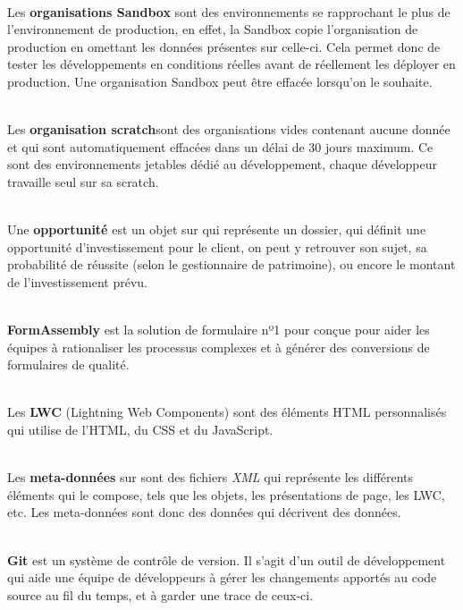 \documentclass[12pt,oneside,noprintercorrection]{iut}
\begin{document}
    ~\\\indent Les \textbf{organisations Sandbox} sont des environnements \slf{} se rapprochant le plus de l'environnement de production, en effet, la Sandbox copie l'organisation de production en omettant les données présentes sur celle-ci. Cela permet donc de tester les développements en conditions réelles avant de réellement les déployer en production. Une organisation Sandbox peut être effacée lorsqu'on le souhaite.\newline
    
    ~\\\indent Les \textbf{organisation scratch}sont des organisations vides contenant aucune donnée et qui sont automatiquement effacées dans un délai de 30 jours maximum. Ce sont des environnements jetables dédié au développement, chaque développeur travaille seul sur sa scratch.\newline


    ~\\\indent Une \textbf{opportunité} est un objet sur \slf{} qui représente un dossier, qui définit une opportunité d'investissement pour le client, on peut y retrouver son sujet, sa probabilité de réussite (selon le gestionnaire de patrimoine), ou encore le montant de l'investissement prévu.\newline


   ~\\\indent \textbf{FormAssembly} est la solution de formulaire nº1 pour \slf{} conçue pour aider les équipes à rationaliser les processus complexes et à générer des conversions de formulaires de qualité.\newline


   ~\\\indent Les \textbf{LWC} (Lightning Web Components) sont des éléments HTML personnalisés qui utilise de l'HTML, du CSS et du JavaScript.\newline

  ~\\\indent  Les \textbf{meta-données} sur \slf{} sont des fichiers \textit{XML} qui représente les différents éléments qui le compose, tels que les objets, les présentations de page, les LWC, etc. Les meta-données sont donc des données qui décrivent des données.\newline


    ~\\\indent \textbf{Git} est un système de contrôle de version. Il s’agit d’un outil de développement qui aide une équipe de développeurs à gérer les changements apportés au code source au fil du temps, et à garder une trace de ceux-ci.\newline
\end{document}

